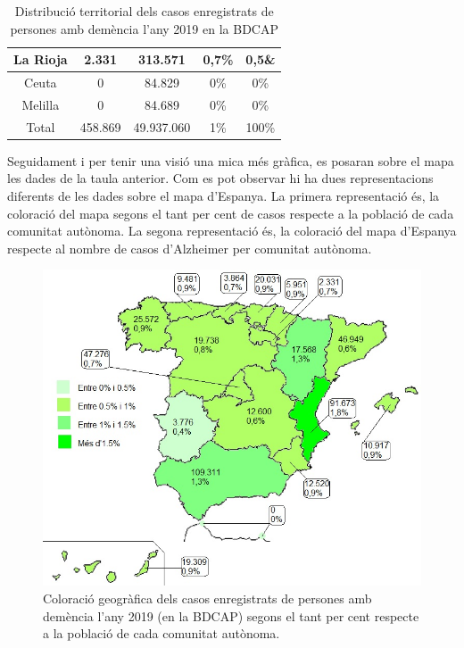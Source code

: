 \documentclass[a4paper,12pt]{article}
\begin{document}
\begin{table}[h]
\begin{tabular}{ |c | c | c | c | c| }
          \hline
         La Rioja & 2.331 & 313.571 & 0,7\% & 0,5\& \\ 
          \hline
         Ceuta & 0 & 84.829 & 0\%  & 0\% \\ 
          \hline
         Melilla & 0 & 84.689 & 0\%  & 0\% \\
          \hline
        Total & 458.869 & 49.937.060 & 1\% & 100\% \\
          \hline
    \end{tabular}
    \caption{Distribució territorial dels casos enregistrats de persones amb demència l'any 2019 en la BDCAP}
    \label{tab:taula1}
\end{table}

Seguidament i per tenir una visió una mica més gràfica, es posaran sobre el mapa les dades de la taula anterior. Com es pot observar hi ha dues representacions diferents de les dades sobre el mapa d'Espanya. La primera representació és, la coloració del mapa segons el tant per cent de casos respecte a la població de cada comunitat autònoma. La segona representació és, la coloració del mapa d'Espanya respecte al nombre de casos d'Alzheimer per comunitat autònoma.
\begin{figure}[H]
    \centering
    \includegraphics[scale = 0.6]{images/distribucio territorial en base a percentatge.jpg}
    \caption{Coloració geogràfica dels casos enregistrats de persones amb demència l'any 2019 (en la BDCAP) segons el tant per cent respecte a la població de cada comunitat autònoma.}
    \label{fig:colorpercent}
\end{figure}
\end{document}
